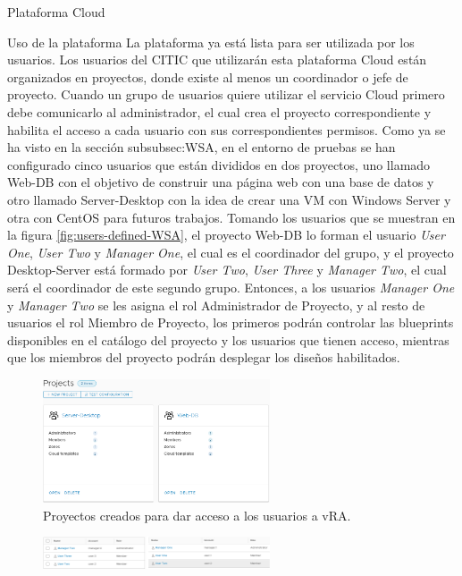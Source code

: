 \begin{subsection}{Plataforma Cloud}
    \begin{subsubsection}{Uso de la plataforma}
        La plataforma ya está lista para ser utilizada por los usuarios. Los usuarios del CITIC que utilizarán esta plataforma Cloud están organizados en proyectos, donde existe al menos un coordinador o jefe de proyecto. Cuando un grupo de usuarios quiere utilizar el servicio Cloud primero debe comunicarlo al administrador, el cual crea el proyecto correspondiente y habilita el acceso a cada usuario con sus correspondientes permisos. 
        Como ya se ha visto en la sección \refname{subsubsec:WSA}, en el entorno de pruebas se han configurado cinco usuarios que están divididos en dos proyectos, uno llamado Web-DB con el objetivo de construir una página web con una base de datos y otro llamado Server-Desktop con la idea de crear una VM con Windows Server y otra con CentOS para futuros trabajos. Tomando los usuarios que se muestran en la figura \ref{fig:users-defined-WSA}, el proyecto Web-DB lo forman el usuario \textit{User One}, \textit{User Two} y \textit{Manager One}, el cual es el coordinador del grupo, y el proyecto Desktop-Server está formado por \textit{User Two}, \textit{User Three} y \textit{Manager Two}, el cual será el coordinador de este segundo grupo. Entonces, a los usuarios \textit{Manager One} y \textit{Manager Two} se les asigna el rol Administrador de Proyecto, y al resto de usuarios el rol Miembro de Proyecto, los primeros podrán controlar las blueprints disponibles en el catálogo del proyecto y los usuarios que tienen acceso, mientras que los miembros del proyecto podrán desplegar los diseños habilitados.
        \begin{figure}[h]
            \centering
            \includegraphics[width=0.6\textwidth]{imaxes/pruebaconcepto/vrealize/projects-vRA.png}
            \caption{Proyectos creados para dar acceso a los usuarios a vRA.}
            \label{fig:projects-vra}
        \end{figure}
        \FloatBarrier
        \begin{figure}[h]
            \centering
            \includegraphics[width=0.6\textwidth]{imaxes/pruebaconcepto/vrealize/users-DB.png}

\end{figure}
\end{subsubsection}
\end{subsection}
